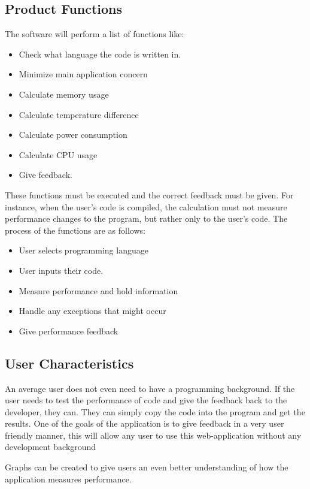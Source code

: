 \documentclass[a4paper,12pt]{article}
\begin{document}
\subsection{Product Functions}
The software will perform a list of functions like:
\begin{itemize}
\item Check what language the code is written in.
\item Minimize main application concern
\item Calculate memory usage
\item Calculate temperature difference
\item Calculate power consumption
\item Calculate CPU usage
\item Give feedback.
\end{itemize}
	
These functions must be executed and the correct feedback must be given. For instance, when the user's code is compiled, the calculation must not measure performance changes to the program, but rather only to the user's code. 
The process of the functions are as follows:
\begin{itemize}
\item User selects programming language
\item User inputs their code.
\item Measure performance and hold information
\item Handle any exceptions that might occur
\item Give performance feedback
\end{itemize}



\subsection{User Characteristics}
An average user does not even need to have a programming background. If the user needs to test the performance of code and give the feedback back to the developer, they can. They can simply copy the code into the program and get the results. One of the goals of the application is to give feedback in a very user friendly manner, this will allow any user to use this web-application without any development background

Graphs can be created to give users an even better understanding of how the application measures performance. 
\end{document}
